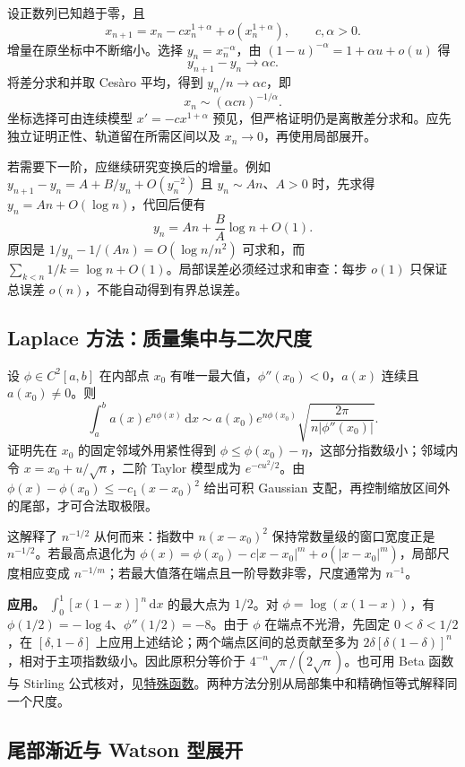 \documentclass[UTF8,12pt,a4paper,fontset=fandol]{ctexart}
\begin{document}
\label{app:estimate-recursion}

设正数列已知趋于零，且
\[
x_{n+1}=x_n-cx_n^{1+\alpha}+o(x_n^{1+\alpha}),\qquad c,\alpha>0.
\]
增量在原坐标中不断缩小。选择 $y_n=x_n^{-\alpha}$，由 $(1-u)^{-\alpha}=1+\alpha u+o(u)$ 得
\[
y_{n+1}-y_n\longrightarrow\alpha c.
\]
将差分求和并取 Cesàro 平均，得到 $y_n/n\to\alpha c$，即
\[
x_n\sim(\alpha cn)^{-1/\alpha}.
\]
坐标选择可由连续模型 $x'=-cx^{1+\alpha}$ 预见，但严格证明仍是离散差分求和。应先独立证明正性、轨道留在所需区间以及 $x_n\to0$，再使用局部展开。

若需要下一阶，应继续研究变换后的增量。例如 $y_{n+1}-y_n=A+B/y_n+O(y_n^{-2})$ 且 $y_n\sim An$、$A>0$ 时，先求得 $y_n=An+O(\log n)$，代回后便有
\[
y_n=An+\frac BA\log n+O(1).
\]
原因是 $1/y_n-1/(An)=O(\log n/n^2)$ 可求和，而 $\sum_{k<n}1/k=\log n+O(1)$。局部误差必须经过求和审查：每步 $o(1)$ 只保证总误差 $o(n)$，不能自动得到有界总误差。

\subsection{Laplace 方法：质量集中与二次尺度}

\label{app:estimate-laplace}

设 $\phi\in C^2[a,b]$ 在内部点 $x_0$ 有唯一最大值，$\phi''(x_0)<0$，$a(x)$ 连续且 $a(x_0)\neq0$。则
\[
\int_a^ba(x)e^{n\phi(x)}\,\mathrm dx
\sim a(x_0)e^{n\phi(x_0)}
\sqrt{\frac{2\pi}{n|\phi''(x_0)|}}.
\]
证明先在 $x_0$ 的固定邻域外用紧性得到 $\phi\leq\phi(x_0)-\eta$，这部分指数级小；邻域内令 $x=x_0+u/\sqrt n$，二阶 Taylor 模型成为 $e^{-cu^2/2}$。由 $\phi(x)-\phi(x_0)\leq-c_1(x-x_0)^2$ 给出可积 Gaussian 支配，再控制缩放区间外的尾部，才可合法取极限。

这解释了 $n^{-1/2}$ 从何而来：指数中 $n(x-x_0)^2$ 保持常数量级的窗口宽度正是 $n^{-1/2}$。若最高点退化为 $\phi(x)=\phi(x_0)-c|x-x_0|^m+o(|x-x_0|^m)$，局部尺度相应变成 $n^{-1/m}$；若最大值落在端点且一阶导数非零，尺度通常为 $n^{-1}$。

\textbf{应用。} $\int_0^1[x(1-x)]^n\,\mathrm dx$ 的最大点为 $1/2$。对 $\phi=\log(x(1-x))$，有 $\phi(1/2)=-\log4$、$\phi''(1/2)=-8$。由于 $\phi$ 在端点不光滑，先固定 $0<\delta<1/2$，在 $[\delta,1-\delta]$ 上应用上述结论；两个端点区间的总贡献至多为 $2\delta[\delta(1-\delta)]^n$，相对于主项指数级小。因此原积分等价于 $4^{-n}\sqrt\pi/(2\sqrt n)$。也可用 Beta 函数与 Stirling 公式核对，见\hyperref[app:special-beta]{特殊函数}。两种方法分别从局部集中和精确恒等式解释同一个尺度。

\subsection{尾部渐近与 Watson 型展开}
\end{document}
